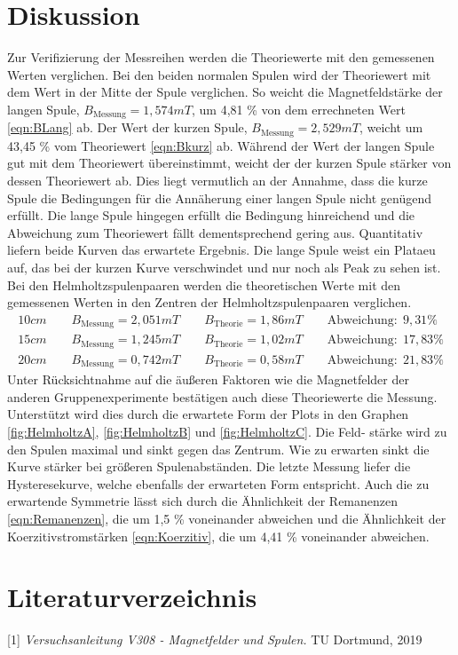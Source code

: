 \documentclass[titlepage = firstcover]{scrartcl}
\begin{document}
\section{Diskussion}
        Zur Verifizierung der Messreihen werden die Theoriewerte mit den gemessenen Werten verglichen. Bei den beiden normalen Spulen wird der Theoriewert mit
        dem Wert in der Mitte der Spule verglichen. So weicht die Magnetfeldstärke der langen Spule, $B_{\text{Messung}} = 1,574 mT$,  um 4,81 \% von dem errechneten Wert 
        \ref{eqn:BLang} ab. Der Wert der kurzen Spule, $B_{\text{Messung}} = 2,529 mT$, weicht um 43,45 \% vom Theoriewert \ref{eqn:Bkurz} ab. Während der Wert
        der langen Spule gut mit dem Theoriewert übereinstimmt, weicht der der kurzen Spule stärker von dessen Theoriewert ab. Dies liegt vermutlich an der 
        Annahme, dass die kurze Spule die Bedingungen für die Annäherung einer langen Spule nicht genügend erfüllt. Die lange Spule hingegen erfüllt die 
        Bedingung hinreichend und die Abweichung zum Theoriewert fällt dementsprechend gering aus. Quantitativ liefern 
        beide Kurven das erwartete Ergebnis. Die lange Spule weist ein Plataeu auf, das bei der kurzen Kurve verschwindet und nur noch als Peak zu sehen ist.
        Bei den Helmholtzspulenpaaren werden die theoretischen Werte mit den gemessenen Werten in den Zentren der Helmholtzspulenpaaren verglichen.
        \begin{align*}
            10cm \qquad B_{\text{Messung}} = 2,051 mT \qquad B_{\text{Theorie}} = 1,86 mT \qquad \text{Abweichung}: \; 9,31 \% \\
            15cm \qquad B_{\text{Messung}} = 1,245 mT \qquad B_{\text{Theorie}} = 1,02 mT \qquad \text{Abweichung}: \; 17,83 \% \\
            20cm \qquad B_{\text{Messung}} = 0,742 mT \qquad B_{\text{Theorie}} = 0,58 mT \qquad \text{Abweichung}: \; 21,83 \% 
        \end{align*}
        Unter Rücksichtnahme auf die äußeren Faktoren wie die Magnetfelder der anderen Gruppenexperimente bestätigen auch diese Theoriewerte die Messung.
        Unterstützt wird dies durch die erwartete Form der Plots in den Graphen \ref{fig:HelmholtzA}, \ref{fig:HelmholtzB} und \ref{fig:HelmholtzC}. Die Feld-
        stärke wird zu den Spulen maximal und sinkt gegen das Zentrum. Wie zu erwarten sinkt die Kurve stärker bei größeren Spulenabständen.
        Die letzte Messung liefer die Hysteresekurve, welche ebenfalls der erwarteten Form entspricht. Auch die zu erwartende Symmetrie lässt sich durch die 
        Ähnlichkeit der Remanenzen \ref{eqn:Remanenzen}, die um 1,5 \% voneinander abweichen und die Ähnlichkeit der Koerzitivstromstärken \ref{eqn:Koerzitiv},
        die um 4,41 \% voneinander abweichen. 

\newpage
\section{Literaturverzeichnis}
        [1] \textit{Versuchsanleitung V308 - Magnetfelder und Spulen.} TU Dortmund, 2019
\end{document}
